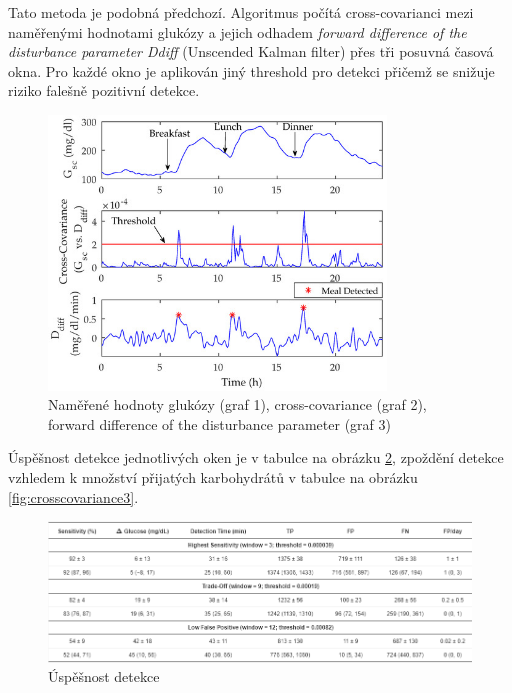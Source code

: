 Tato metoda je podobná předchozí. Algoritmus počítá cross-covarianci mezi naměřenými hodnotami glukózy a jejich odhadem \textit{forward difference of the disturbance parameter Ddiff} (Unscended Kalman filter) přes tři posuvná časová okna. Pro každé okno je aplikován jiný threshold pro detekci přičemž se snižuje riziko falešně pozitivní detekce.

\begin{figure}[H]
\caption{Naměřené hodnoty glukózy (graf 1), cross-covariance (graf 2), forward difference of the disturbance parameter (graf 3)}
\label{fig:crosscovariance1}
\centering
\includegraphics[width=0.8\textwidth]{img/analyza/crosscovariance1.jpg}
\end{figure}

Úspěšnost detekce jednotlivých oken je v tabulce na obrázku \ref{fig:crosscovariance2}, zpoždění detekce vzhledem k množství přijatých karbohydrátů v tabulce na obrázku \ref{fig:crosscovariance3}.

\begin{figure}[H]
\caption{Úspěšnost detekce}
\label{fig:crosscovariance2}
\includegraphics[width=1\textwidth]{img/analyza/crosscovariance2.png}
\end{figure}


